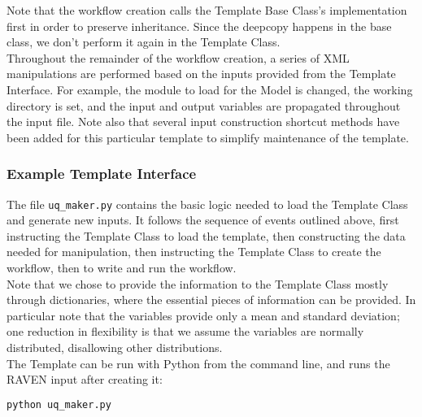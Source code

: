 Note that the workflow creation calls the Template Base Class's implementation first in order to preserve inheritance. Since the deepcopy happens in the base class, we don't perform it again in the Template Class.
\\

Throughout the remainder of the workflow creation, a series of XML manipulations are performed based on the inputs provided from the Template Interface. For example, the module to load for the Model is changed, the working directory is set, and the input and output variables are propagated throughout the input file. Note also that several input construction shortcut methods have been added for this particular template to simplify maintenance of the template.


\subsubsection{Example Template Interface}
The file \texttt{uq\_maker.py} contains the basic logic needed to load the Template Class and generate new inputs. It follows the sequence of events outlined above, first instructing the Template Class to load the template, then constructing the data needed for manipulation, then instructing the Template Class to create the workflow, then to write and run the workflow.
\\

Note that we chose to provide the information to the Template Class mostly through dictionaries, where the essential pieces of information can be provided. In particular note that the variables provide only a mean and standard deviation; one reduction in flexibility is that we assume the variables are normally distributed, disallowing other distributions.
\\

The Template can be run with Python from the command line, and runs the RAVEN input after creating it:
\begin{lstlisting}[language=bash]
 python uq_maker.py
\end{lstlisting}
